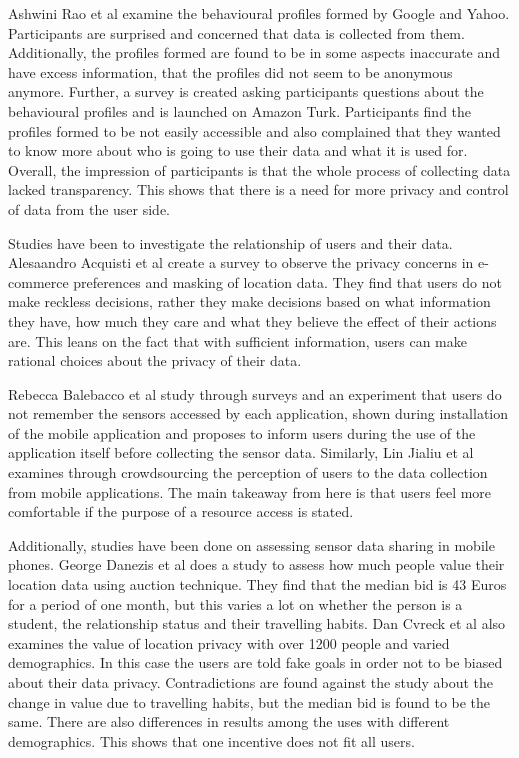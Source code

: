 Ashwini Rao et al \cite{rao2015they} examine the behavioural profiles formed by Google and Yahoo. Participants are surprised and concerned that data is collected from them. Additionally, the profiles formed are found to be in some aspects inaccurate and have excess information, that the profiles did not seem to be anonymous anymore. Further, a survey is created asking participants questions about the behavioural profiles and is launched on Amazon Turk. Participants find the profiles formed to be not easily accessible and also complained that they wanted to know more about who is going to use their data and what it is used for. Overall, the impression of participants is that the whole process of collecting data lacked transparency. This shows that there is a need for more privacy and control of data from the user side.

Studies have been to investigate the relationship of users and their data. Alesaandro Acquisti et al \cite{acquisti2005privacy} create a survey to observe the privacy concerns in e-commerce preferences and masking of location data. They find that users do not make reckless decisions, rather they make decisions based on what information they have, how much they care and what they believe the effect of their actions are. This leans on the fact that with sufficient information, users can make rational choices about the privacy of their data. 

Rebecca Balebacco et al \cite{balebako2015impact} study through surveys and an experiment that users do not remember the sensors accessed by each application, shown during installation of the mobile application and proposes to inform users during the use of the application itself before collecting the sensor data. Similarly, Lin Jialiu et al \cite{lin2012expectation} examines through crowdsourcing the perception of users to the data collection from mobile applications. The main takeaway from here is that users feel more comfortable if the purpose of a resource access is stated.

Additionally, studies have been done on assessing sensor data sharing in mobile phones. George Danezis et al \cite{danezis2005much} does a study to assess how much people value their location data using auction technique. They find that the median bid is 43 Euros for a period of one month, but this varies a lot on whether the person is a student, the relationship status and their travelling habits.  Dan Cvreck et al \cite{cvrcek2006study} also examines the value of location privacy with over 1200 people and varied demographics. In this case the users are told fake goals in order not to be biased about their data privacy. Contradictions are found against the study \cite{danezis2005much} about the change in value due to travelling habits, but the median bid is found to be the same. There are also differences in results among the uses with different demographics. This shows that one incentive does not fit all users.

